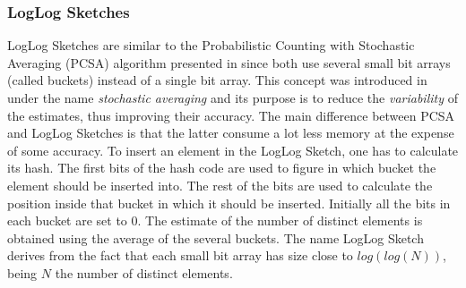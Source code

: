 \subsubsection{LogLog Sketches}
\label{sec:loglog-sketches}
LogLog Sketches \cite{Durand:2003tc} are similar to the Probabilistic
Counting with Stochastic Averaging (PCSA) algorithm presented in
\cite{Flajolet:1985wd} since both use several small bit arrays (called
buckets) instead of a single bit array. This concept was introduced in
\cite{Flajolet:1985wd} under the name \emph{stochastic averaging} and
its purpose is to reduce the \emph{variability} of the estimates, thus
improving their accuracy. The main difference between PCSA and LogLog
Sketches is that the latter consume a lot less memory at the expense
of some accuracy. To insert an element in the LogLog Sketch, one has
to calculate its hash. The first bits of the hash code are used to
figure in which bucket the element should be inserted into. The rest
of the bits are used to calculate the position inside that bucket in
which it should be inserted. Initially all the bits in each bucket are
set to $0$. The estimate of the number of distinct elements is
obtained using the average of the several buckets. The name LogLog
Sketch derives from the fact that each small bit array has size close
to $log(log(N))$, being $N$ the number of distinct elements. 

